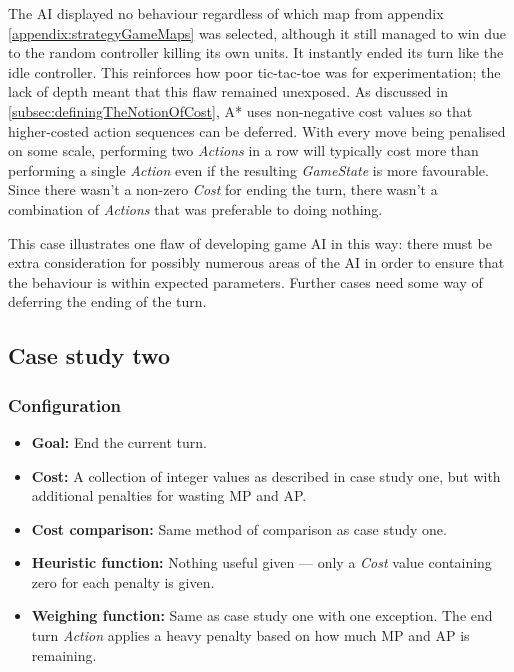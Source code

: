 \documentclass[11pt, a4paper]{report}
\begin{document}
The AI displayed no behaviour regardless of which map from appendix \ref{appendix:strategyGameMaps} was selected, although it still managed to win due to the random controller killing its own units. It instantly ended its turn like the idle controller. This reinforces how poor tic-tac-toe was for experimentation; the lack of depth meant that this flaw remained unexposed. As discussed in \ref{subsec:definingTheNotionOfCost}, A* uses non-negative cost values so that higher-costed action sequences can be deferred. With every move being penalised on some scale, performing two \emph{Actions} in a row will typically cost more than performing a single \emph{Action} even if the resulting \emph{GameState} is more favourable. Since there wasn't a non-zero \emph{Cost} for ending the turn, there wasn't a combination of \emph{Actions} that was preferable to doing nothing. 

This case illustrates one flaw of developing game AI in this way: there must be extra consideration for possibly numerous areas of the AI in order to ensure that the behaviour is within expected parameters. Further cases need some way of deferring the ending of the turn.

\subsection{Case study two}
\label{subsec:caseStudyTwo}

\subsubsection{Configuration}

\begin{itemize}
  \item \textbf{Goal:} End the current turn.
  \item \textbf{Cost:} A collection of integer values as described in case study one, but with additional penalties for wasting MP and AP.
  \item \textbf{Cost comparison:} Same method of comparison as case study one.
  \item \textbf{Heuristic function:} Nothing useful given --- only a \emph{Cost} value containing zero for each penalty is given.
  \item \textbf{Weighing function:} Same as case study one with one exception. The end turn \emph{Action} applies a heavy penalty based on how much MP and AP is remaining.
\end{itemize}
\end{document}
